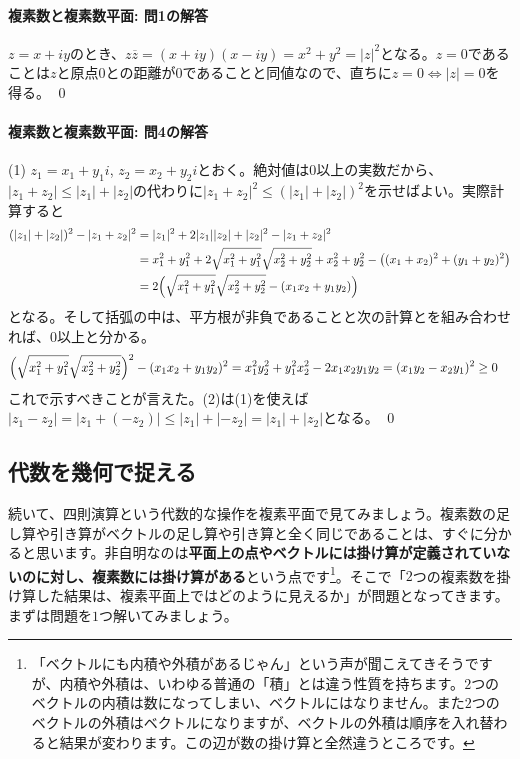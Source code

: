 \paragraph{複素数と複素数平面: 問1の解答}
$z=x+iy$のとき、$z\overline{z}=(x+iy)(x-iy)=x^2+y^2=|z|^2$となる。$z=0$であることは$z$と原点$0$との距離が$0$であることと同値なので、直ちに$z=0\Leftrightarrow|z|=0$を得る。 \qed

\paragraph{複素数と複素数平面: 問4の解答}

(1) $z_1 = x_1+y_1 i$, $z_2 = x_2 + y_2 i$とおく。絶対値は$0$以上の実数だから、$|z_1+z_2|\leq |z_1|+|z_2|$の代わりに$|z_1+z_2|^2\leq (|z_1|+|z_2|)^2$を示せばよい。実際計算すると
\begin{align*}
(|z_1|+|z_2|)^2 - |z_1+z_2|^2 
&= |z_1|^2 + 2|z_1||z_2| + |z_2|^2 - |z_1+z_2|^2 \\
&= x_1^2+y_1^2 + 2\sqrt{x_1^2+y_1^2}\sqrt{x_2^2+y_2^2} + x_2^2 + y_2^2 - \bigl((x_1+x_2)^2+(y_1+y_2)^2\bigr) \\
&= 2\Bigl(\sqrt{x_1^2+y_1^2}\sqrt{x_2^2+y_2^2} -(x_1x_2+y_1y_2) \Bigr)
\end{align*}
となる。そして括弧の中は、平方根が非負であることと次の計算とを組み合わせれば、$0$以上と分かる。
\begin{align*}
\Bigl(\sqrt{x_1^2+y_1^2}\sqrt{x_2^2+y_2^2}\Bigr)^2 - (x_1x_2+y_1y_2)^2
&= x_1^2y_2^2+y_1^2x_2^2 - 2x_1x_2y_1y_2 = (x_1y_2-x_2y_1)^2 \geq 0
\end{align*}
これで示すべきことが言えた。(2)は(1)を使えば$|z_1-z_2| = |z_1 + (-z_2) | \leq |z_1|+|{-z_2}| = |z_1| + |z_2|$となる。 \qed


\subsection{代数を幾何で捉える}

続いて、四則演算という代数的な操作を複素平面で見てみましょう。複素数の足し算や引き算がベクトルの足し算や引き算と全く同じであることは、すぐに分かると思います。非自明なのは\textbf{平面上の点やベクトルには掛け算が定義されていないのに対し、複素数には掛け算がある}という点です\footnote{「ベクトルにも内積や外積があるじゃん」という声が聞こえてきそうですが、内積や外積は、いわゆる普通の「積」とは違う性質を持ちます。$2$つのベクトルの内積は数になってしまい、ベクトルにはなりません。また$2$つのベクトルの外積はベクトルになりますが、ベクトルの外積は順序を入れ替わると結果が変わります。この辺が数の掛け算と全然違うところです。}。そこで「$2$つの複素数を掛け算した結果は、複素平面上ではどのように見えるか」が問題となってきます。まずは問題を$1$つ解いてみましょう。

